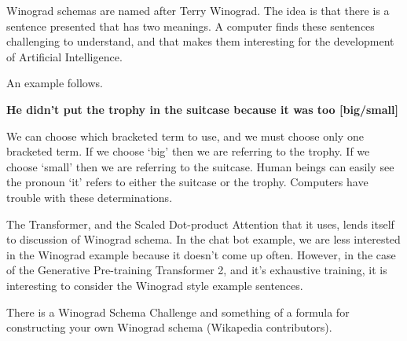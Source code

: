Winograd schemas are named after Terry Winograd. The idea is that there is a sentence presented that has two meanings. A computer finds these sentences challenging to understand, and that makes them interesting for the development of Artificial Intelligence.

An example follows.

\begin{center}
	\textbf{He didn't put the trophy in the suitcase because it was too [big/small]}
\end{center}

We can choose which bracketed term to use, and we must choose only one bracketed term. If we choose `big' then we are referring to the trophy. If we choose `small' then we are referring to the suitcase. Human beings can easily see the pronoun `it' refers to either the suitcase or the trophy. Computers have trouble with these determinations.

The Transformer, and the Scaled Dot-product Attention that it uses, lends itself to discussion of Winograd schema. In the chat bot example, we are less interested in the Winograd example because it doesn't come up often. However, in the case of the Generative Pre-training Transformer 2, and it's exhaustive training, it is interesting to consider the Winograd style example sentences.

There is a Winograd Schema Challenge and something of a formula for constructing your own Winograd schema (Wikapedia contributors). \cite{wiki:xxx}

